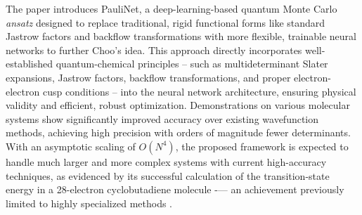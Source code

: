 The paper introduces PauliNet, a deep-learning-based quantum Monte Carlo \textit{ansatz} designed to replace traditional, rigid functional forms like standard Jastrow factors and backflow transformations with more flexible, trainable neural networks to further Choo's idea. This approach directly incorporates well-established quantum-chemical principles -- such as multideterminant Slater expansions, Jastrow factors, backflow transformations, and proper electron-electron cusp conditions -- into the neural network architecture, ensuring physical validity and efficient, robust optimization. Demonstrations on various molecular systems show significantly improved accuracy over existing wavefunction methods, achieving high precision with orders of magnitude fewer determinants. With an asymptotic scaling of $O(N^4)$, the proposed framework is expected to handle much larger and more complex systems with current high-accuracy techniques, as evidenced by its successful calculation of the transition-state energy in a 28-electron cyclobutadiene molecule -— an achievement previously limited to highly specialized methods \cite{hermann_deep-neural-network_2020}.

